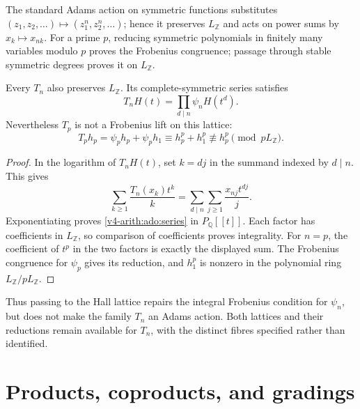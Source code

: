 \begin{theorem}
\label{v4-arith:thm:macdonald-lattice}
The standard Adams action on symmetric functions substitutes
\((z_1,z_2,\ldots)\mapsto(z_1^n,z_2^n,\ldots)\); hence it preserves
\(L_{\mathbb Z}\) and acts on power sums by \(x_k\mapsto x_{nk}\).
For a prime \(p\), reducing symmetric polynomials in finitely many
variables modulo \(p\) proves the Frobenius congruence; passage through
stable symmetric degrees proves it on \(L_{\mathbb Z}\).
\end{theorem}


\begin{proposition}
\label{v4-arith:ado:hall-integrality}
Every \(T_n\) also preserves \(L_{\mathbb Z}\). Its complete-symmetric
series satisfies
\begin{equation}
\label{v4-arith:ado:series}
 T_n H(t)=\prod_{d\mid n}\psi_n H(t^d).
\end{equation}
Nevertheless \(T_p\) is not a Frobenius lift on this lattice:
\[
 T_ph_p=\psi_ph_p+\psi_ph_1
       \equiv h_p^p+h_1^p\not\equiv h_p^p\pmod{pL_{\mathbb Z}}.
\]
\end{proposition}

\begin{proof}
In the logarithm of \(T_nH(t)\), set \(k=dj\) in the summand indexed
by \(d\mid n\). This gives
\[
 \sum_{k\ge1}\frac{T_n(x_k)t^k}{k}
 =\sum_{d\mid n}\sum_{j\ge1}\frac{x_{nj}t^{dj}}{j}.
\]
Exponentiating proves \eqref{v4-arith:ado:series} in
\(P_{\mathbb Q}[[t]]\). Each factor has coefficients in
\(L_{\mathbb Z}\), so comparison of coefficients proves integrality.
For \(n=p\), the coefficient of \(t^p\) in the two factors is exactly
the displayed sum. The Frobenius congruence for \(\psi_p\) gives its
reduction, and \(h_1^p\) is nonzero in the polynomial ring
\(L_{\mathbb Z}/pL_{\mathbb Z}\).
\end{proof}

Thus passing to the Hall lattice repairs the integral Frobenius condition
for \(\psi_n\), but does not make the family \(T_n\) an Adams action.
Both lattices and their reductions remain available for \(T_n\), with
the distinct fibres specified rather than identified.

\section{Products, coproducts, and gradings}
\label{v4-arith:ado:structures}

